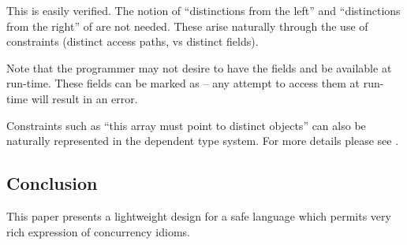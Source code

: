This is easily verified.
The notion of ``distinctions from the left'' and ``distinctions from
the right'' of \cite{DPJ} are not needed. These arise naturally
through the use of constraints (distinct access paths, vs distinct fields).

Note that the programmer may not desire to have the fields 
and  be available at run-time. These fields can be marked
as  -- any attempt to access them at run-time will result
in an error.

Constraints such as ``this array must point to distinct objects'' can
also be naturally represented in the dependent type system. For more
details please see \cite{effects-constrained-types}.

\subsection{Conclusion}

This paper presents a lightweight design for a safe language which
permits very rich expression of concurrency idioms.
